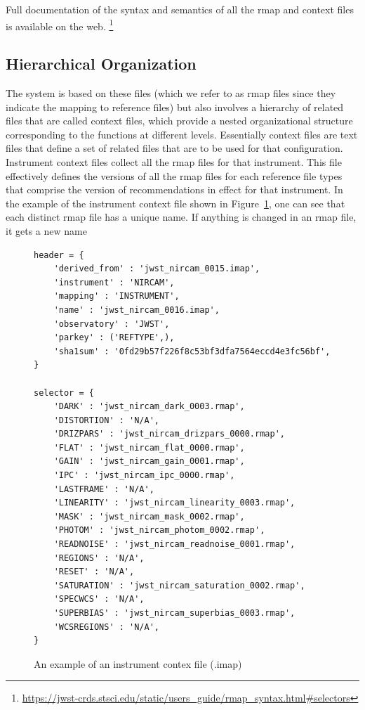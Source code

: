\documentclass[final,authoryear,5p,times,twocolumn]{elsarticle}
\begin{document}
Full documentation of the syntax and semantics of all the rmap and
context files is available on the web.
\footnote{\url{https://jwst-crds.stsci.edu/static/users\_guide/rmap\_syntax.html\#selectors}}

\subsection{Hierarchical Organization}

The system is based on these files (which we refer to as rmap files since they
indicate the mapping to reference files) but also involves a hierarchy of
related files that are called context files, which provide a nested 
organizational structure corresponding to the functions at different levels. Essentially context files are
text files that define a set of related files that are to be used for
that configuration.
Instrument context files collect all the rmap files for that
instrument. This file effectively defines the versions of all the rmap files
for each reference file types that comprise the version of recommendations in
effect for that instrument. In the example of the instrument context file
shown in Figure~\ref{fig:example_instrument_context},
one can see that each distinct rmap file has a unique name. If anything
is changed in an rmap file, it gets a new name

\begin{figure}
\begin{mdframed}
\begin{verbatim}
header = {
    'derived_from' : 'jwst_nircam_0015.imap',
    'instrument' : 'NIRCAM',
    'mapping' : 'INSTRUMENT',
    'name' : 'jwst_nircam_0016.imap',
    'observatory' : 'JWST',
    'parkey' : ('REFTYPE',),
    'sha1sum' : '0fd29b57f226f8c53bf3dfa7564eccd4e3fc56bf',
}

selector = {
    'DARK' : 'jwst_nircam_dark_0003.rmap',
    'DISTORTION' : 'N/A',
    'DRIZPARS' : 'jwst_nircam_drizpars_0000.rmap',
    'FLAT' : 'jwst_nircam_flat_0000.rmap',
    'GAIN' : 'jwst_nircam_gain_0001.rmap',
    'IPC' : 'jwst_nircam_ipc_0000.rmap',
    'LASTFRAME' : 'N/A',
    'LINEARITY' : 'jwst_nircam_linearity_0003.rmap',
    'MASK' : 'jwst_nircam_mask_0002.rmap',
    'PHOTOM' : 'jwst_nircam_photom_0002.rmap',
    'READNOISE' : 'jwst_nircam_readnoise_0001.rmap',
    'REGIONS' : 'N/A',
    'RESET' : 'N/A',
    'SATURATION' : 'jwst_nircam_saturation_0002.rmap',
    'SPECWCS' : 'N/A',
    'SUPERBIAS' : 'jwst_nircam_superbias_0003.rmap',
    'WCSREGIONS' : 'N/A',
}
\end{verbatim}
\end{mdframed}
\caption{An example of an instrument contex file (.imap)}
\label{fig:example_instrument_context}
\end{figure}
\end{document}
